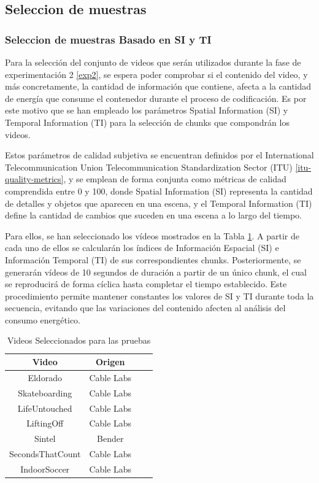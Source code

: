 \subsection{Seleccion de muestras}
\subsubsection{Seleccion de muestras Basado en SI y TI}
Para la selección del conjunto de videos que serán utilizados durante la fase de experimentación 2 \ref{exp2}, se espera poder comprobar si el contenido del video, y más concretamente, la cantidad de información que contiene, afecta a la cantidad de energía que consume el contenedor durante el proceso de codificación. Es por este motivo que se han empleado los parámetros Spatial Information (SI) y Temporal Information (TI) para la selección de chunks que compondrán los videos.\

Estos parámetros de calidad subjetiva se encuentran definidos por el International Telecommunication Union Telecommunication Standardization Sector (ITU) \ref{itu-quality-metrics}, y se emplean de forma conjunta como métricas de calidad comprendida entre 0 y 100, donde Spatial Information (SI) representa la cantidad de detalles y objetos que aparecen en una escena, y el Temporal Information (TI) define la cantidad de cambios que suceden en una escena a lo largo del tiempo.\

Para ellos, se han seleccionado los vídeos mostrados en la Tabla \ref{tab:lista-videos-exp2}. A partir de cada uno de ellos se calcularán los índices de Información Espacial (SI) e Información Temporal (TI) de sus correspondientes chunks. Posteriormente, se generarán vídeos de 10 segundos de duración a partir de un único chunk, el cual se reproducirá de forma cíclica hasta completar el tiempo establecido. Este procedimiento permite mantener constantes los valores de SI y TI durante toda la secuencia, evitando que las variaciones del contenido afecten al análisis del consumo energético.\
\begin{table}[h!]
\center
\begin{tabular}{cccc}
\hline
\textbf{Video} & \textbf{Origen} \\ \hline
Eldorado & Cable Labs         \\
Skateboarding & Cable Labs         \\
LifeUntouched & Cable Labs         \\
LiftingOff & Cable Labs         \\
Sintel & Bender         \\
SecondsThatCount & Cable Labs         \\
IndoorSoccer & Cable Labs         \\ \hline
\end{tabular}
\label{tab:lista-videos-exp2}
\caption{Videos Seleccionados para las pruebas}
\end{table}

